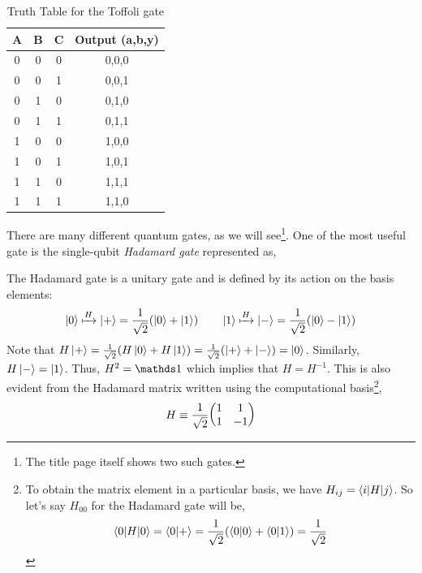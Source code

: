 \begin{table}[H]
    \centering
    \caption{Truth Table for the Toffoli gate}
    \vspace{0.2cm}
    \begin{tabular}{|c|c|c||c|}
    \hline
    \textbf{A} & \textbf{B} & \textbf{C} & \textbf{Output (a,b,y)}  \\
    \hline
    0 & 0 & 0  & 0,0,0 \\
    0 & 0 & 1  & 0,0,1 \\
    0 & 1 & 0 & 0,1,0 \\
    0 & 1 & 1  & 0,1,1 \\
    1 & 0 & 0  & 1,0,0 \\
    1 & 0 & 1  & 1,0,1 \\
    1 & 1 & 0 & 1,1,1 \\
    1 & 1 & 1  & 1,1,0 \\
    \hline
    \end{tabular}
    \end{table}
    \noindent
    There are many different quantum gates, as we will see\footnote{The title page itself shows two such gates.}. One of the most useful gate is the single-qubit \textit{Hadamard gate} represented as,
     \begin{figure}[H]
            \centering
        \end{figure} 
        \noindent
The Hadamard gate is a unitary gate and is defined by its action on the basis elements:
$$\ket{0}\xmapsto{H}\ket{+} = \frac{1}{\sqrt{2}}(\ket{0}+\ket{1})\qquad \ket{1}\xmapsto{H}\ket{-}= \frac{1}{\sqrt{2}}(\ket{0}-\ket{1})$$
Note that $H\ket{+} = \frac{1}{\sqrt{2}}(H\ket{0}+H\ket{1}) = \frac{1}{\sqrt{2}}(\ket{+}+\ket{-}) = \ket{0}$. Similarly, $H\ket{-}=\ket{1}$. Thus, $H^2=\iden$ which implies that $H=H^{-1}$. This is also evident from the Hadamard matrix written using the computational basis\footnote{To obtain the matrix element in a particular basis, we have $H_{ij} =\braket{i|H|j}$. So let's say $H_{00}$ for the Hadamard gate will be, $$\braket{0|H|0} = \braket{0|+} = \frac{1}{\sqrt{2}}(\braket{0|0}+\braket{0|1}) = \frac{1}{\sqrt{2}}$$}, 
\begin{align*}
    H\equiv \frac{1}{\sqrt{2}}\mqty(1& 1 \\ 1 & -1)
\end{align*}

